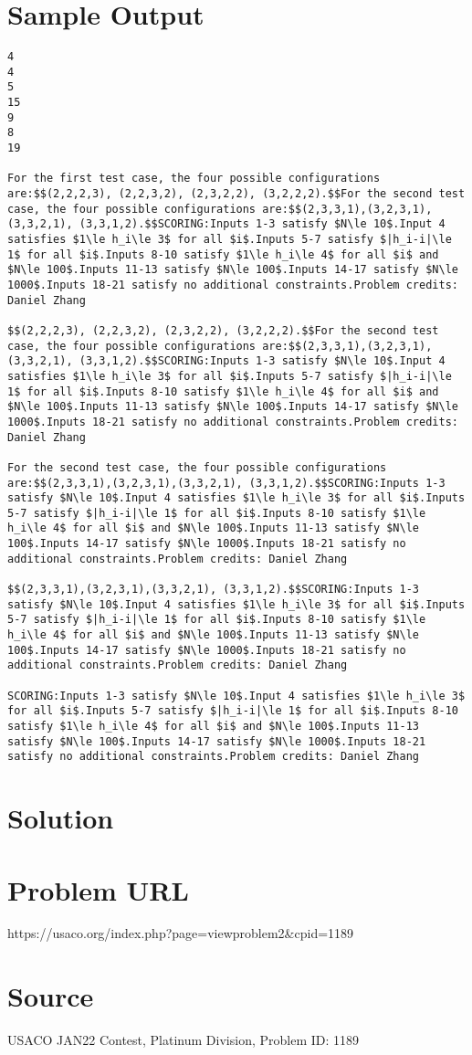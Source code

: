 \documentclass[12pt]{article}
\begin{document}
\section*{Sample Output}
\begin{verbatim}
4
4
5
15
9
8
19

For the first test case, the four possible configurations are:$$(2,2,2,3), (2,2,3,2), (2,3,2,2), (3,2,2,2).$$For the second test case, the four possible configurations are:$$(2,3,3,1),(3,2,3,1),(3,3,2,1), (3,3,1,2).$$SCORING:Inputs 1-3 satisfy $N\le 10$.Input 4 satisfies $1\le h_i\le 3$ for all $i$.Inputs 5-7 satisfy $|h_i-i|\le 1$ for all $i$.Inputs 8-10 satisfy $1\le h_i\le 4$ for all $i$ and $N\le 100$.Inputs 11-13 satisfy $N\le 100$.Inputs 14-17 satisfy $N\le 1000$.Inputs 18-21 satisfy no additional constraints.Problem credits: Daniel Zhang

$$(2,2,2,3), (2,2,3,2), (2,3,2,2), (3,2,2,2).$$For the second test case, the four possible configurations are:$$(2,3,3,1),(3,2,3,1),(3,3,2,1), (3,3,1,2).$$SCORING:Inputs 1-3 satisfy $N\le 10$.Input 4 satisfies $1\le h_i\le 3$ for all $i$.Inputs 5-7 satisfy $|h_i-i|\le 1$ for all $i$.Inputs 8-10 satisfy $1\le h_i\le 4$ for all $i$ and $N\le 100$.Inputs 11-13 satisfy $N\le 100$.Inputs 14-17 satisfy $N\le 1000$.Inputs 18-21 satisfy no additional constraints.Problem credits: Daniel Zhang

For the second test case, the four possible configurations are:$$(2,3,3,1),(3,2,3,1),(3,3,2,1), (3,3,1,2).$$SCORING:Inputs 1-3 satisfy $N\le 10$.Input 4 satisfies $1\le h_i\le 3$ for all $i$.Inputs 5-7 satisfy $|h_i-i|\le 1$ for all $i$.Inputs 8-10 satisfy $1\le h_i\le 4$ for all $i$ and $N\le 100$.Inputs 11-13 satisfy $N\le 100$.Inputs 14-17 satisfy $N\le 1000$.Inputs 18-21 satisfy no additional constraints.Problem credits: Daniel Zhang

$$(2,3,3,1),(3,2,3,1),(3,3,2,1), (3,3,1,2).$$SCORING:Inputs 1-3 satisfy $N\le 10$.Input 4 satisfies $1\le h_i\le 3$ for all $i$.Inputs 5-7 satisfy $|h_i-i|\le 1$ for all $i$.Inputs 8-10 satisfy $1\le h_i\le 4$ for all $i$ and $N\le 100$.Inputs 11-13 satisfy $N\le 100$.Inputs 14-17 satisfy $N\le 1000$.Inputs 18-21 satisfy no additional constraints.Problem credits: Daniel Zhang

SCORING:Inputs 1-3 satisfy $N\le 10$.Input 4 satisfies $1\le h_i\le 3$ for all $i$.Inputs 5-7 satisfy $|h_i-i|\le 1$ for all $i$.Inputs 8-10 satisfy $1\le h_i\le 4$ for all $i$ and $N\le 100$.Inputs 11-13 satisfy $N\le 100$.Inputs 14-17 satisfy $N\le 1000$.Inputs 18-21 satisfy no additional constraints.Problem credits: Daniel Zhang
\end{verbatim}

\section*{Solution}


\section*{Problem URL}
https://usaco.org/index.php?page=viewproblem2&cpid=1189

\section*{Source}
USACO JAN22 Contest, Platinum Division, Problem ID: 1189
\end{document}

